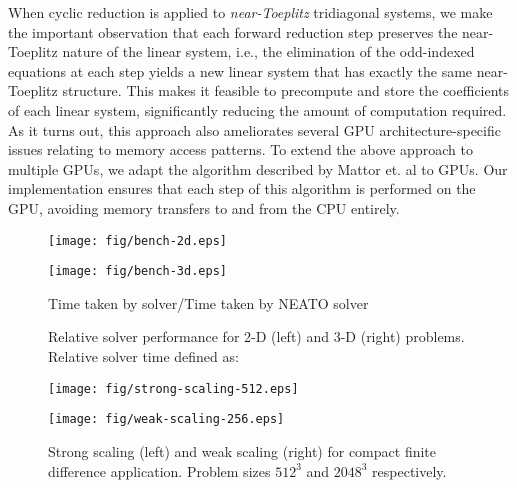 \documentclass[letterpaper,10pt]{article}
\begin{document}
When cyclic reduction is applied to
\emph{near-Toeplitz} tridiagonal systems,
we make the important observation that
each forward reduction step preserves the near-Toeplitz
nature of the linear system, i.e.,
the elimination of the odd-indexed equations at each step
yields a new linear system that has
exactly the same near-Toeplitz structure.
This makes it feasible to precompute and store
the coefficients of each linear system,
significantly reducing the amount of computation required.
As it turns out,
this approach also ameliorates several
GPU architecture-specific issues relating to
memory access patterns.
To extend the above approach to multiple GPUs,
we adapt the algorithm described by Mattor et. al
\cite{mattor1995algorithm}
to GPUs.
Our implementation ensures that
each step of this algorithm is performed on the GPU,
avoiding memory transfers to and from the CPU entirely.
%
\begin{figure}
\centering
\begin{minipage}[b]{0.45\textwidth}
\begin{center}
\texttt{[image: fig/bench-2d.eps]}
\end{center}
\end{minipage}
\begin{minipage}[b]{0.45\textwidth}
\begin{center}
\texttt{[image: fig/bench-3d.eps]}
\end{center}
\end{minipage}
\caption{Relative solver performance
for 2-D (left) and 3-D (right) problems.
Relative solver time defined as:}
Time taken by solver/Time taken by NEATO solver
\label{fig:bench}
\end{figure}
%
\iffalse
\begin{figure}
\centering
\begin{minipage}[b]{0.45\textwidth}
\begin{center}
\texttt{[image: fig/strong-scaling-512.eps]}
\end{center}
\end{minipage}
\begin{minipage}[b]{0.45\textwidth}
\begin{center}
\texttt{[image: fig/weak-scaling-256.eps]}
\end{center}
\end{minipage}
\caption{Strong scaling (left) and weak scaling (right)
    for compact finite difference application.
    Problem sizes $512^3$ and $2048^3$ respectively.}
\label{fig:scaling}
\end{figure}
\end{document}
